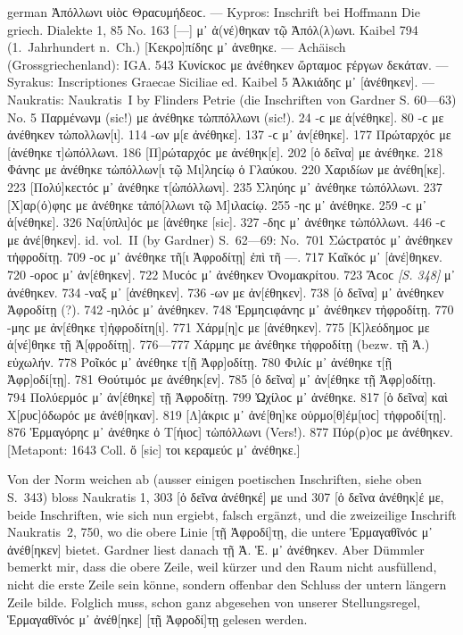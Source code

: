 \begin{otherlanguage*}{german}
Ἀπόλλωνι υἱὸϲ Θραϲυμήδεοϲ. — Kypros: Inschrift bei Hoffmann Die griech. Dialekte 1, 85 No. 163 [—] μ᾽ ἀ(νέ)θηκαν τῷ Ἀπόλ(λ)ωνι. Kaibel 794 (1.~Jahrhundert n.~Ch.) [Κεκρο]πíδηϲ μ᾽ ἀνεθηκε. — Achäisch (Grossgriechenland): IGA. 543 Κυνίϲκοϲ με ἀνέθηκεν ὥρταμοϲ ϝέργων δεκάταν. — Syrakus: Inscriptiones Graecae Siciliae ed. Kaibel 5 Ἀλκιάδηϲ μ᾽ [ἀνέθηκεν]. — Naukratis: Naukratis~I by Flinders Petrie (die Inschriften von Gardner S. 60—63) No. 5 Παρμένωνμ (sic!) με ἀνέθηκε τὠππόλλωνι (sic!). 24 -ϲ με ἀ[νέθηκε]. 80 -ϲ με ἀνέθηκεν τὠπολλων[ι]. 114 -ων μ[ε ἀνέθηκε]. 137 -ϲ μ᾽ ἀν[έθηκε]. 177 Πρώταρχόϲ με [ἀνέθηκε τ]ὠπόλλωνι. 186 [Π]ρώταρχόϲ με ἀνέθηκ[ε]. 202 [ὁ δεῖνα] με ἀνέ\-θη\-κε. 218 Φάνηϲ με ἀνέθηκε τὠπόλλων[ι τῷ Μι]ληϲίῳ ὁ Γλαύκου. 220 Χαριδíων με ἀνέθη[κε]. 223 [Πολύ]κεϲτόϲ μ᾽ ἀνέθηκε τ[ὠπόλλωνι]. 235 Σληύηϲ μ᾽ ἀνέθηκε τὠπόλλωνι. 237 [Χ]αρ(ό)φηϲ με ἀνέθηκε τἀπό[λλωνι τῷ Μ]ιλαϲίῳ. 255 -ηϲ μ᾽ ἀνέθηκε. 259 -ϲ μ᾽ ἀ[νέθηκε]. 326 Να[ύπλι]όϲ με [ἀνέθηκε [sic]. 327 -δηϲ μ᾽ ἀνέ\-θη\-κε τὠπόλλωνι. 446 -ϲ με ἀνέ[θηκεν]. id. vol.~II (by Gardner) S.~62—69: No.~701 Σώϲτρατόϲ μ᾽ ἀνέθηκεν τἠφροδίτῃ. 709 -οϲ μ᾽ ἀνέθηκε τῆ[ι Ἀφροδίτῃ] ἐπὶ τῆ —. 717 Καῖκόϲ μ᾽ [ἀνέ]θηκεν. 720 -οροϲ μ᾽ ἀν[έθηκεν]. 722 Μυϲόϲ μ᾽ ἀνέθηκεν Ὀνομακρίτου. 723 Ἄϲοϲ \hypertarget{p348}{\emph{[S. 348]}}\label{p348} μ᾽ ἀνέθηκεν. 734 -ναξ μ᾽ [ἀνέθηκεν]. 736 -ων με ἀν[έθηκεν]. 738 [ὁ δεῖνα] μ᾽ ἀνέθηκεν Ἀφροδίτῃ (?). 742 -ηιλόϲ μ᾽ ἀνέθηκεν. 748 Ἑρμηϲιφάνηϲ μ᾽ ἀνέθηκεν τἠφροδίτῃ. 770 -μηϲ με ἀν[έθηκε τ]ἠφροδίτη[ι]. 771 Χάρμ[η]ϲ με [ἀνέθηκεν]. 775 [Κ]λεόδημοϲ με ἀ[νέ]θηκε τῇ Ἀ[φροδίτῃ]. 776—777 Χάρμηϲ με ἀνέθηκε τἠφροδίτῃ (bezw. τῇ Ἀ.) εὐχωλήν. 778 Ροῖκόϲ μ᾽ ἀνέθηκε τ[ῇ Ἀφρ]οδίτῃ. 780 Φιλίϲ μ᾽ ἀνέθηκε τ[ῇ Ἀφρ]οδί[τῃ]. 781 Θούτιμόϲ με ἀνέθηκ[εν]. 785 [ὁ δεῖνα] μ᾽ ἀν[έθηκε τῇ Ἀφρ]οδίτῃ. 794 Πολύερμόϲ μ᾽ ἀν[έθηκε] τῇ Ἀφρο\-δί\-τῃ. 799 Ὠχίλοϲ μ᾽ ἀνέθηκε. 817 [ὁ δεῖνα] καὶ Χ[ρυϲ]όδωρόϲ με ἀνέθ[ηκαν]. 819 [Λ]ά\-κρι\-[τό]ϲ μ᾽ ἀνέ[θη]κε οὑρμο[θ]έμ[ιοϲ] τἠφροδί[τῃ]. 876 Ἑρμαγόρηϲ μ᾽ ἀνέ\-θηκε ὁ Τ[ήιοϲ] τὠπόλλωνι (Vers!). 877 Πύρ(ρ)οϲ με ἀνέθηκεν. [Metapont: 1643 Coll. ὄ [sic]
τοι κεραμεύϲ μ᾽ ἀνέθηκε.]

Von der Norm weichen ab (ausser einigen poetischen Inschriften, siehe oben S.~343) bloss Naukratis 1, 303 [ὁ δεῖνα ἀνέθηκέ] με und 307 [ὁ δεῖνα ἀνέθηκ]έ με, beide Inschriften, wie sich nun ergiebt, falsch ergänzt, und die zweizeilige Inschrift Naukratis~2, 750, wo die obere Linie [τῇ Ἀφροδί]τῃ, die untere Ἑρμαγα\-θῖνόϲ μ᾽ ἀνέθ[ηκεν] bietet. Gardner liest danach τῇ Ἀ. Ἑ. μ᾽ ἀνέθηκεν. Aber Dümmler bemerkt mir, dass die obere Zeile, weil kürzer und den Raum nicht ausfüllend, nicht die erste Zeile sein könne, sondern offenbar den Schluss der untern längern Zeile bilde. Folglich muss, schon ganz abgesehen von unserer Stellungsregel, Ἑρμαγαθῖνόϲ μ᾽ ἀνέθ[ηκε] [τῇ Ἀφροδί]τῃ gelesen werden.


\end{otherlanguage*}
